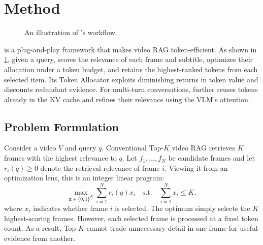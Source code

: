 \section{Method}
\label{sec:method}

\begin{figure}[t]
  \centering
  \makebox[\linewidth][c]{}
  \caption{An illustration of \name's workflow.}
  \label{fig:overview}
\end{figure}






\name is a plug-and-play framework that makes video RAG token-efficient. As shown in \cref{fig:overview}, given a query, \name scores the relevance of each frame and subtitle, optimizes their allocation under a token budget, and retains the highest-ranked tokens from each selected item. Its Token Allocator exploits diminishing returns in token value and discounts redundant evidence. For multi-turn conversations, \name further reuses tokens already in the KV cache and refines their relevance using the VLM's attention.


\subsection{Problem Formulation}
\label{sec:overview}



Consider a video $V$ and query $q$. Conventional Top-$K$ video RAG retrieves $K$ frames with the highest relevance to $q$. Let $f_1,\ldots,f_N$ be candidate frames and let $r_i(q)\geq 0$ denote the retrieval relevance of frame $i$. Viewing it from an optimization lens, this is an integer linear program:
\begin{equation}
  \max_{\mathbf{x}\in\{0,1\}^N}
  \sum_{i=1}^{N}r_i(q)x_i
  \quad\text{s.t.}\quad \sum_{i=1}^{N}x_i\leq K,
  \label{eq:topk}
\end{equation}
where $x_i$ indicates whether frame $i$ is selected. The optimum simply selects the $K$ highest-scoring frames. However, each selected frame is processed at a fixed token count. As a result, Top-$K$ cannot trade unnecessary detail in one frame for useful evidence from another.


